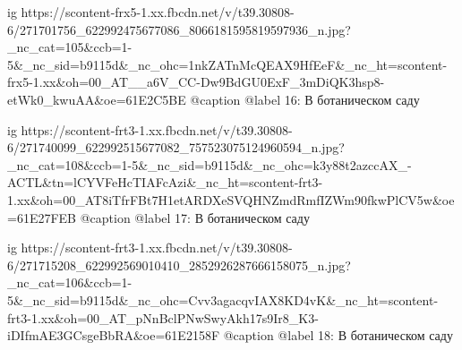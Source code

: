  
 
 
 
 

\ifcmt
ig https://scontent-frx5-1.xx.fbcdn.net/v/t39.30808-6/271701756_622992475677086_8066181595819597936_n.jpg?_nc_cat=105&ccb=1-5&_nc_sid=b9115d&_nc_ohc=1nkZATnMcQEAX9HfEeF&_nc_ht=scontent-frx5-1.xx&oh=00_AT__a6V_CC-Dw9BdGU0ExF_3mDiQK3hsp8-etWk0_kwuAA&oe=61E2C5BE
@caption @label 16: В ботаническом саду

ig https://scontent-frt3-1.xx.fbcdn.net/v/t39.30808-6/271740099_622992515677082_757523075124960594_n.jpg?_nc_cat=108&ccb=1-5&_nc_sid=b9115d&_nc_ohc=k3y88t2azccAX_-ACTL&tn=lCYVFeHcTIAFcAzi&_nc_ht=scontent-frt3-1.xx&oh=00_AT8iTfrFBt7H1etARDXeSVQHNZmdRmfIZWm90fkwPlCV5w&oe=61E27FEB
@caption @label 17: В ботаническом саду

ig https://scontent-frt3-1.xx.fbcdn.net/v/t39.30808-6/271715208_622992569010410_2852926287666158075_n.jpg?_nc_cat=106&ccb=1-5&_nc_sid=b9115d&_nc_ohc=Cvv3agacqvIAX8KD4vK&_nc_ht=scontent-frt3-1.xx&oh=00_AT_pNnBclPNwSwyAkh17s9Ir8_K3-iDIfmAE3GCsgeBbRA&oe=61E2158F
@caption @label 18: В ботаническом саду
\fi
